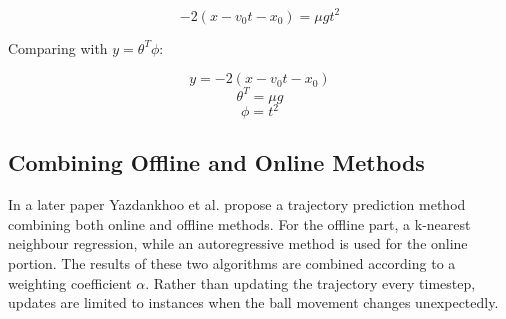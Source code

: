 \[ -2(x - v_0 t - x_0) = \mu g t^2 \]

Comparing with $y = \theta^T \phi$:

\[ y = -2(x - v_0 t - x_0) \]
\[ \theta^T = \mu g \]
\[ \phi = t^2 \]

\subsection{Combining Offline and Online Methods}

In a later paper Yazdankhoo et al. \cite{Yazdankhoo2021} propose a trajectory prediction method combining both online and offline methods. For the offline part, a k-nearest neighbour regression, while an autoregressive method is used for the online portion. The results of these two algorithms are combined according to a weighting coefficient $\alpha$. Rather than updating the trajectory every timestep, updates are limited to instances when the ball movement changes unexpectedly. 

\nocite{Maire2000}
